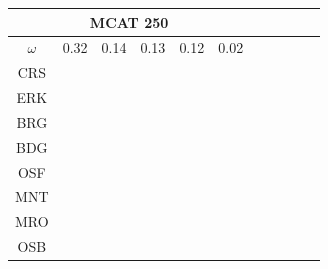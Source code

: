 \documentclass[12pt]{article}
\begin{document}
\begin{landscape}
\begin{figure}
\vspace*{-2.1cm}
\hspace*{5cm}
\begin{minipage}[c]{0.3\textwidth}
\hspace*{-5cm}
\begin{tabular}{|c|c|c|c|c|c|c|c|c|c|c|}
        \hline \multicolumn{6}{|c|}{MCAT 250} \\ \hline
        $\omega$&0.32&0.14&0.13&0.12&0.02 \\ \hline %
        CRS&\cellcolor[HTML]{E41A1C}&\cellcolor[HTML]{E41A1C}&\cellcolor[HTML]{E41A1C}&\cellcolor[HTML]{E41A1C}&\cellcolor[HTML]{E41A1C}\\ \hline %
        ERK&\cellcolor[HTML]{377EB8}&\cellcolor[HTML]{377EB8}&\cellcolor[HTML]{377EB8}&\cellcolor[HTML]{377EB8}&\cellcolor[HTML]{377EB8}\\ \hline %
        BRG&\cellcolor[HTML]{4DAF4A}&\cellcolor[HTML]{4DAF4A}&\cellcolor[HTML]{4DAF4A}&\cellcolor[HTML]{4DAF4A}&\cellcolor[HTML]{4DAF4A}\\ \hline %
        BDG&\cellcolor[HTML]{4DAF4A}&\cellcolor[HTML]{4DAF4A}&\cellcolor[HTML]{4DAF4A}&\cellcolor[HTML]{4DAF4A}&\cellcolor[HTML]{4DAF4A}\\ \hline %
        OSF&\cellcolor[HTML]{984EA3}&\cellcolor[HTML]{984EA3}&\cellcolor[HTML]{984EA3}&\cellcolor[HTML]{984EA3}&\cellcolor[HTML]{4DAF4A}\\ \hline %
        MNT&\cellcolor[HTML]{984EA3}&\cellcolor[HTML]{984EA3}&\cellcolor[HTML]{984EA3}&\cellcolor[HTML]{984EA3}&\cellcolor[HTML]{984EA3}\\ \hline %
        MRO&\cellcolor[HTML]{984EA3}&\cellcolor[HTML]{984EA3}&\cellcolor[HTML]{984EA3}&\cellcolor[HTML]{984EA3}&\cellcolor[HTML]{984EA3}\\ \hline %
        OSB&\cellcolor[HTML]{FF7F00}&\cellcolor[HTML]{FF7F00}&\cellcolor[HTML]{FF7F00}&\cellcolor[HTML]{FF7F00}&\cellcolor[HTML]{FF7F00}\\ \hline %

\end{tabular}
\end{minipage}
\end{figure}
\end{landscape}
\end{document}
